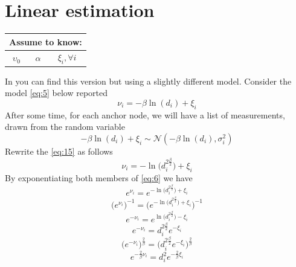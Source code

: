 \documentclass[12pt]{report}
\begin{document}
\section{Linear estimation}
\begin{center}
    \begin{tabular}{ |c|c|c| } 
    \hline
    \multicolumn{3}{|c|}{ \textbf{Assume to know:} } \\
    \hline
    $\upsilon_0$ & $\alpha$ & $\xi_i,\forall i$\\
    \hline
    \end{tabular}
\end{center}  
In \cite{rzk} you can find this version but using a slightly different model.
Consider the model \eqref{eq:5} below reported
\begin{equation}
    \nu_i=-\beta\ln(d_i)+\xi_i
    \label{eq:15}
\end{equation}
After some time, for each anchor node, we will have a list of measurements, drawn from the random variable 
\begin{equation}
-\beta\ln(d_i)+\xi_i\sim \mathcal{N}(-\beta\ln(d_i),\sigma_i^2)
\label{eq:14}
\end{equation}
Rewrite the \eqref{eq:15} as follows 
\begin{equation}
    \nu_i=-\ln\big(d_i^{2\frac{\beta}{2}}\big)+\xi_i
    \label{eq:6}
\end{equation}
By exponentiating both members of \eqref{eq:6} we have 
\begin{equation}
    e^{\nu_i}=e^{-\ln\big(d_i^{2\frac{\beta}{2}}\big)+\xi_i}
\end{equation}
\begin{equation}
    \bigg(e^{\nu_i}\bigg)^{-1}=\bigg(e^{-\ln\big(d_i^{2\frac{\beta}{2}}\big)+\xi_i}\bigg)^{-1}
\end{equation}
\begin{equation}
    e^{-\nu_i}=e^{\ln\big(d_i^{2\frac{\beta}{2}}\big)-\xi_i}
\end{equation}
\begin{equation}
    e^{-\nu_i}=d_i^{2\frac{\beta}{2}}e^{-\xi_i}
\end{equation}
\begin{equation}
    \bigg(e^{-\nu_i}\bigg)^{\frac{2}{\beta}}=\bigg(d_i^{2\frac{\beta}{2}}e^{-\xi_i}\bigg)^{\frac{2}{\beta}}
\end{equation}
\begin{equation}
    e^{-\frac{2}{\beta}\nu_i}=d_i^2e^{-\frac{2}{\beta}\xi_i}
\end{equation}
\end{document}
